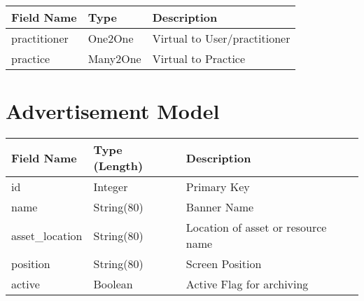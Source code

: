 \documentclass[letterpaper,10pt,english]{sphinxmanual}
\begin{document}
\begin{tabulary}{\linewidth}{|L|L|L|}
\hline
\textsf{\relax 
Field Name
} & \textsf{\relax 
Type
} & \textsf{\relax 
Description
}\\
\hline
practitioner
 & 
One2One
 & 
Virtual to User/practitioner
\\

practice
 & 
Many2One
 & 
Virtual to Practice
\\
\hline\end{tabulary}



\section{Advertisement Model}
\label{dev-models:advertisement-model}\label{dev-models:advertisement-model-label}
\begin{tabulary}{\linewidth}{|L|L|L|}
\hline
\textsf{\relax 
Field Name
} & \textsf{\relax 
Type (Length)
} & \textsf{\relax 
Description
}\\
\hline
id
 & 
Integer
 & 
Primary Key
\\

name
 & 
String(80)
 & 
Banner Name
\\

asset\_location
 & 
String(80)
 & 
Location of asset or resource name
\\

position
 & 
String(80)
 & 
Screen Position
\\

active
 & 
Boolean
 & 
Active Flag for archiving
\\
\hline\end{tabulary}
\end{document}

